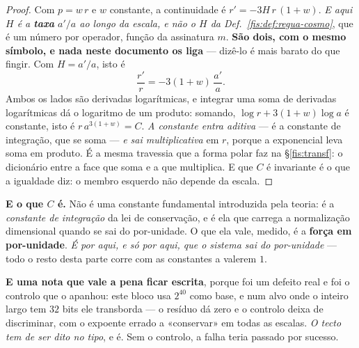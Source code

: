 \documentclass[livro.tex]{subfiles}
\begin{document}
\begin{proof}
Com $p=w\,r$ e $w$ constante, a continuidade é
$r'=-3H\,r\,(1+w)$. \emph{E aqui $H$ é a \textbf{taxa} $a'/a$ ao longo da escala,
e não o $H$ da Def.~\ref{fis:def:regua-cosmo}}, que é um número por operador,
função da assinatura $m$. \textbf{São dois, com o mesmo símbolo, e nada neste
documento os liga} --- dizê-lo é mais barato do que fingir. Com $H=a'/a$, isto é
\[
\frac{r'}{r}=-3(1+w)\,\frac{a'}{a} .
\]
Ambos os lados são derivadas logarítmicas, e integrar uma soma de derivadas
logarítmicas dá o logaritmo de um produto: somando, $\log r+3(1+w)\log a$ é
constante, isto é $r\,a^{3(1+w)}=C$. \emph{A constante entra aditiva} --- é a
constante de integração, que se soma --- \emph{e sai multiplicativa} em $r$,
porque a exponencial leva soma em produto. É a mesma travessia que a forma polar
faz na §\ref{fis:transf}: o dicionário entre a face que soma e a que multiplica.
E que $C$ é invariante é o que a igualdade diz: o membro esquerdo não depende da
escala.
\end{proof}

\medskip\noindent\textbf{E o que $C$ é.} Não é uma constante fundamental
introduzida pela teoria: é a \emph{constante de integração} da lei de
conservação, e é ela que carrega a normalização dimensional quando se sai do
por-unidade. O que ela vale, medido, é a \textbf{força em por-unidade}. \emph{É
por aqui, e só por aqui, que o sistema sai do por-unidade} --- todo o resto desta
parte corre com as constantes a valerem $1$.


\medskip\noindent\textbf{E uma nota que vale a pena ficar escrita}, porque foi
um defeito real e foi o controlo que o apanhou: este bloco usa $2^{40}$ como
base, e num alvo onde o inteiro largo tem $32$ bits ele transborda --- o resíduo
dá zero e o controlo deixa de discriminar, com o expoente errado a «conservar»
em todas as escalas. \emph{O tecto tem de ser dito no tipo}, e é. Sem o
controlo, a falha teria passado por sucesso.
\end{document}
